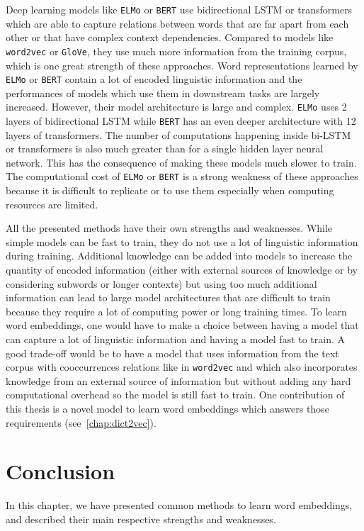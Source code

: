     Deep learning models like \texttt{ELMo} or \texttt{BERT} use bidirectional
    LSTM or transformers which are able to capture relations between words that
    are far apart from each other or that have complex context dependencies.
    Compared to models like \texttt{word2vec} or \texttt{GloVe}, they use much
    more information from the training corpus, which is one great strength of
    these approaches. Word representations learned by \texttt{ELMo} or
    \texttt{BERT} contain a lot of encoded linguistic information and the
    performances of models which use them in downstream tasks are largely
    increased. However, their model architecture is large and complex.
    \texttt{ELMo} uses 2 layers of bidirectional LSTM while \texttt{BERT} has an
    even deeper architecture with 12 layers of transformers. The number of
    computations happening inside bi-LSTM or transformers is also much greater
    than for a single hidden layer neural network. This has the consequence of
    making these models much slower to train. The computational cost of
    \texttt{ELMo} or \texttt{BERT} is a strong weakness of these approaches
    because it is difficult to replicate or to use them especially when
    computing resources are limited. \medskip

    All the presented methods have their own strengths and weaknesses. While
    simple models can be fast to train, they do not use a lot of linguistic
    information during training. Additional knowledge can be added into
    models to increase the quantity of encoded information (either with external
    sources of knowledge or by considering subwords or longer contexts) but
    using too much additional information can lead to large model architectures
    that are difficult to train because they require a lot of computing power or
    long training times. To learn word embeddings, one would have to make a
    choice between having a model that can capture a lot of linguistic
    information and having a model fast to train. A good trade-off would be to
    have a model that uses information from the text corpus with cooccurrences
    relations like in \texttt{word2vec} and which also incorporates knowledge
    from an external source of information but without adding any hard
    computational overhead so the model is still fast to train. One contribution
    of this thesis is a novel model to learn word embeddings which answers those
    requirements (see~\autoref{chap:dict2vec}).

\section{Conclusion}
  In this chapter, we have presented common methods to learn word embeddings,
  and described their main respective strengths and weaknesses.\medskip

